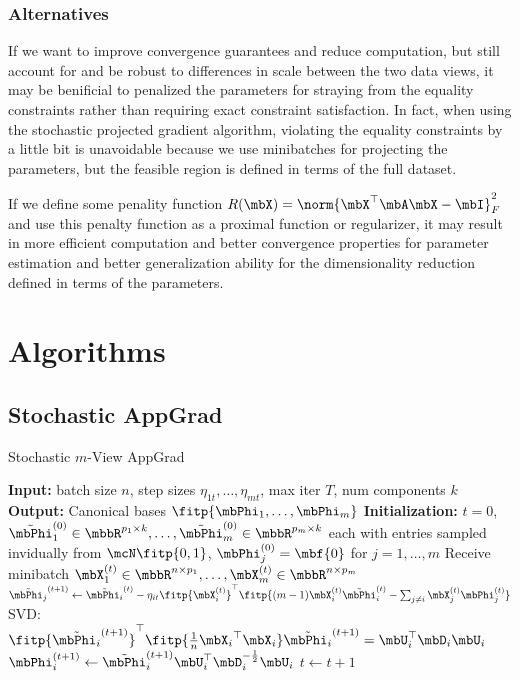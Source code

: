 \documentclass{article}
\begin{document}
	\subsubsection{Alternatives} \label{subsubsec:alternatives}
	If we want to improve convergence guarantees and reduce computation, but still account for and be robust to differences in scale between the two data views, it may be benificial to penalized the parameters for straying from the equality constraints rather than requiring exact constraint satisfaction. In fact, when using the stochastic projected gradient algorithm, violating the equality constraints by a little bit is unavoidable because we use minibatches for projecting the parameters, but the feasible region is defined in terms of the full dataset.
	
	If we define some penality function $R(\mbX) = \norm{\mbX^{\top}\mbA\mbX - \mbI}_F^2$ and use this penalty function as a proximal function or regularizer, it may result in more efficient computation and better convergence properties for parameter estimation and better generalization ability for the dimensionality reduction defined in terms of the parameters.
	
\section{Algorithms} \label{sec:alg}

	\subsection{Stochastic AppGrad} \label{subsec:appgrad}
	
	\begin{algorithm}
	\caption{Stochastic $m$-View AppGrad} \label{alg:stochappgrad}
	\begin{algorithmic}[1]
		\STATE \textbf{Input:} batch size $n$, step sizes $\eta_{1t},\ldots,\eta_{mt}$, max iter $T$, num components $k$
		\STATE \textbf{Output:} Canonical bases $\fitp{\mbPhi_1, \ldots, \mbPhi_m}$
		\STATE \textbf{Initialization:} $t=0$, $\tilde{\mbPhi}_1^{(0)} \in \mbbR^{p_1 \times k}, \ldots, \tilde{\mbPhi}_m^{(0)} \in \mbbR^{p_m \times k}$ each with entries sampled invidually from $\mcN \fitp{0,1}$, $\mbPhi_j^{(0)} = \mbf{0}$ for $j = 1,\ldots,m$
		\STATE Receive minibatch $\mbX_1^{(t)} \in \mbbR^{n \times p_1}, \ldots, \mbX_m^{(t)} \in \mbbR^{n \times p_m}$
		\STATE $\tilde{\mbPhi_j}^{(t+1)} \leftarrow \tilde{\mbPhi_i}^{(t)} - \eta_{it}\fitp{\mbX_i^{(t)}}^{\top}\fitp{(m-1)\mbX_i^{(t)}\tilde{\mbPhi}_i^{(t)} - \sum_{j \neq i}\mbX_j^{(t)}\mbPhi_j^{(t)}}$
		\STATE SVD: $\fitp{\tilde{\mbPhi_i}^{(t+1)}}^{\top} \fitp{\frac{1}{n} {\mbX_i}^{\top}\mbX_i}\tilde{\mbPhi_i}^{(t+1)} = \mbU_i^{\top}\mbD_i\mbU_i$
		\STATE $\mbPhi_i^{(t+1)} \leftarrow \tilde{\mbPhi}_i^{(t+1)}\mbU_i^{\top}\mbD_i^{-\frac{1}{2}}\mbU_i$
		\ENDFOR
		\STATE $t \leftarrow t+1$
		\ENDWHILE
	\end{algorithmic}
	\end{algorithm}
	
\end{document}

